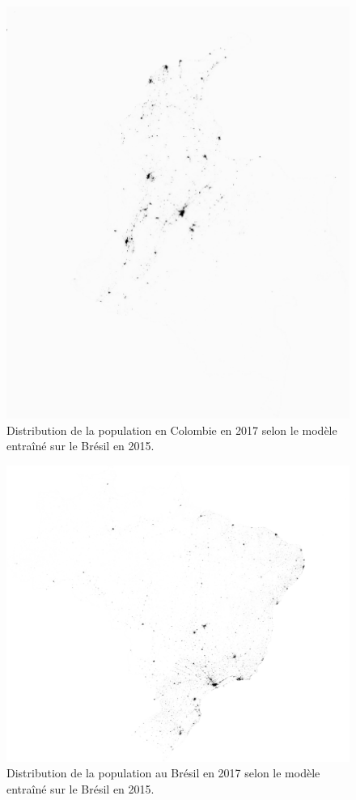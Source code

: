 \documentclass[a4paper, 11pt]{report}
\begin{document}
\begin{figure}
	\centering
	\includegraphics[width=\textwidth]{img/pred_colombia_2017.png}
	\caption{Distribution de la population en Colombie en 2017 selon le modèle entraîné sur le Brésil en 2015.}
	\label{pred_colombia_2017}
\end{figure}

\begin{figure}
	\centering
	\includegraphics[width=\textwidth]{img/pred_brazil_2017.png}
	\caption{Distribution de la population au Brésil en 2017 selon le modèle entraîné sur le Brésil en 2015.}
	\label{pred_brazil_2017}
\end{figure}
\end{document}
